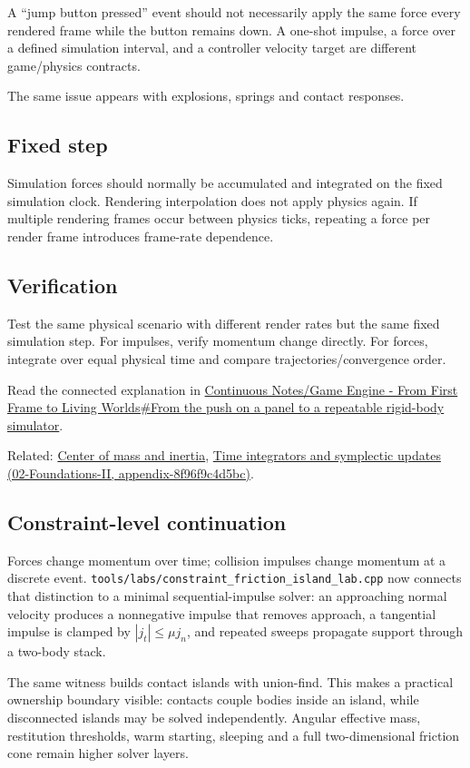 A ``jump button pressed'' event should not necessarily apply the same force every rendered frame while the button remains down. A one-shot impulse, a force over a defined simulation interval, and a controller velocity target are different game/physics contracts.

The same issue appears with explosions, springs and contact responses.

\subsection{Fixed step}\label{appendix-c39931e6e4c2-fixed-step}

Simulation forces should normally be accumulated and integrated on the fixed simulation clock. Rendering interpolation does not apply physics again. If multiple rendering frames occur between physics ticks, repeating a force per render frame introduces frame-rate dependence.

\subsection{Verification}\label{appendix-c39931e6e4c2-verification}

Test the same physical scenario with different render rates but the same fixed simulation step. For impulses, verify momentum change directly. For forces, integrate over equal physical time and compare trajectories/convergence order.

Read the connected explanation in \hyperref[06-engine-ii-ch034-from-the-push-on-a-panel-to-a-repeatable-rigid-body-simulator]{Continuous Notes/Game Engine - From First Frame to Living Worlds\#From the push on a panel to a repeatable rigid-body simulator}.

Related: \hyperref[appendix-66742099f8a0]{Center of mass and inertia}, \href{../02-Foundations-II/main.pdf\#nameddest=appendix-8f96f9c4d5bc}{Time integrators and symplectic updates (02-Foundations-II, appendix-8f96f9c4d5bc)}.

\subsection{Constraint-level continuation}\label{appendix-c39931e6e4c2-constraint-level-continuation}

Forces change momentum over time; collision impulses change momentum at a discrete event. \texttt{tools/labs/constraint\_friction\_island\_lab.cpp} now connects that distinction to a minimal sequential-impulse solver: an approaching normal velocity produces a nonnegative impulse that removes approach, a tangential impulse is clamped by \(|j_t|\le\mu j_n\), and repeated sweeps propagate support through a two-body stack.

The same witness builds contact islands with union-find. This makes a practical ownership boundary visible: contacts couple bodies inside an island, while disconnected islands may be solved independently. Angular effective mass, restitution thresholds, warm starting, sleeping and a full two-dimensional friction cone remain higher solver layers.
